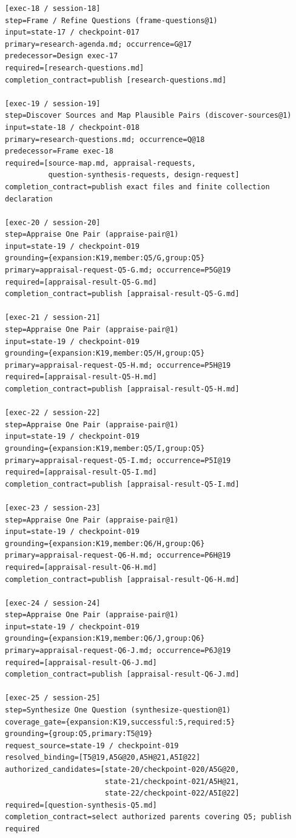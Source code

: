\documentclass[11pt]{article}
\begin{document}
\begin{lstlisting}[style=playbook,basicstyle=\ttfamily\tiny]
[exec-18 / session-18]
step=Frame / Refine Questions (frame-questions@1)
input=state-17 / checkpoint-017
primary=research-agenda.md; occurrence=G@17
predecessor=Design exec-17
required=[research-questions.md]
completion_contract=publish [research-questions.md]

[exec-19 / session-19]
step=Discover Sources and Map Plausible Pairs (discover-sources@1)
input=state-18 / checkpoint-018
primary=research-questions.md; occurrence=Q@18
predecessor=Frame exec-18
required=[source-map.md, appraisal-requests,
          question-synthesis-requests, design-request]
completion_contract=publish exact files and finite collection declaration

[exec-20 / session-20]
step=Appraise One Pair (appraise-pair@1)
input=state-19 / checkpoint-019
grounding={expansion:K19,member:Q5/G,group:Q5}
primary=appraisal-request-Q5-G.md; occurrence=P5G@19
required=[appraisal-result-Q5-G.md]
completion_contract=publish [appraisal-result-Q5-G.md]

[exec-21 / session-21]
step=Appraise One Pair (appraise-pair@1)
input=state-19 / checkpoint-019
grounding={expansion:K19,member:Q5/H,group:Q5}
primary=appraisal-request-Q5-H.md; occurrence=P5H@19
required=[appraisal-result-Q5-H.md]
completion_contract=publish [appraisal-result-Q5-H.md]

[exec-22 / session-22]
step=Appraise One Pair (appraise-pair@1)
input=state-19 / checkpoint-019
grounding={expansion:K19,member:Q5/I,group:Q5}
primary=appraisal-request-Q5-I.md; occurrence=P5I@19
required=[appraisal-result-Q5-I.md]
completion_contract=publish [appraisal-result-Q5-I.md]

[exec-23 / session-23]
step=Appraise One Pair (appraise-pair@1)
input=state-19 / checkpoint-019
grounding={expansion:K19,member:Q6/H,group:Q6}
primary=appraisal-request-Q6-H.md; occurrence=P6H@19
required=[appraisal-result-Q6-H.md]
completion_contract=publish [appraisal-result-Q6-H.md]

[exec-24 / session-24]
step=Appraise One Pair (appraise-pair@1)
input=state-19 / checkpoint-019
grounding={expansion:K19,member:Q6/J,group:Q6}
primary=appraisal-request-Q6-J.md; occurrence=P6J@19
required=[appraisal-result-Q6-J.md]
completion_contract=publish [appraisal-result-Q6-J.md]

[exec-25 / session-25]
step=Synthesize One Question (synthesize-question@1)
coverage_gate={expansion:K19,successful:5,required:5}
grounding={group:Q5,primary:T5@19}
request_source=state-19 / checkpoint-019
resolved_binding=[T5@19,A5G@20,A5H@21,A5I@22]
authorized_candidates=[state-20/checkpoint-020/A5G@20,
                       state-21/checkpoint-021/A5H@21,
                       state-22/checkpoint-022/A5I@22]
required=[question-synthesis-Q5.md]
completion_contract=select authorized parents covering Q5; publish required


\end{lstlisting}
\end{document}
